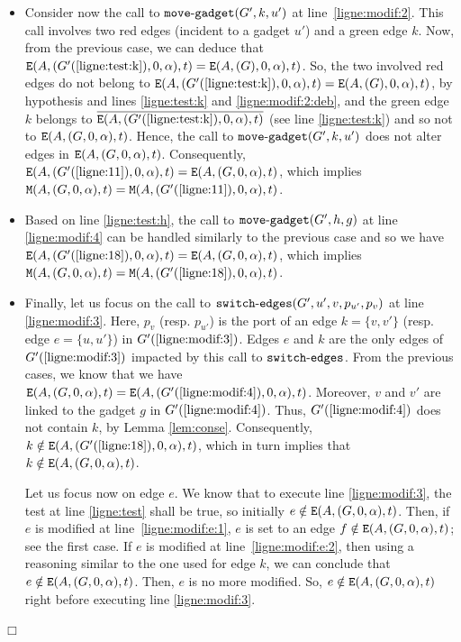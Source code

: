 \documentclass[11pt]{article}
\newcommand{\qed}{\hfill $\Box$ \bigbreak}
\newenvironment{proof}{\noindent {\bf Proof.}}{\qed}
\begin{document}
{\begin{proof}
\begin{itemize}
\item Consider now the call to ${\tt move\mbox{-}gadget}(G',k,u')$ at
  line~\ref{ligne:modif:2}. This call involves two red edges (incident
  to a gadget $u'$) and a green edge $k$.  Now, from the previous
  case, we can deduce that ${\tt E}(A,(G'(\ref{ligne:test:k}),0,\alpha),t) = {\tt E}(A,(G),0,\alpha),t)$. So, the two
  involved red edges do not belong to ${\tt E}(A,(G'(\ref{ligne:test:k}),0,\alpha),t) = {\tt E}(A,(G),0,\alpha),t)$, by
  hypothesis and lines \ref{ligne:test:k} and \ref{ligne:modif:2:deb}, and the green edge $k$ belongs to $\overline{{\tt
      E}(A,(G'(\ref{ligne:test:k}),0,\alpha),t)}$ (see line
  \ref{ligne:test:k}) and so not to ${\tt
    E}(A,(G,0,\alpha),t)$. Hence, the call to ${\tt
    move\mbox{-}gadget}(G',k,u')$ does not alter edges in ${\tt
    E}(A,(G,0,\alpha),t)$. Consequently, ${\tt
    E}(A,(G'(\ref{ligne:11}),0,\alpha),t) = {\tt
    E}(A,(G,0,\alpha),t)$, which implies ${\tt
    M}(A,(G,0,\alpha),t)={\tt M}(A,(G'(\ref{ligne:11}),0,\alpha),t)$.

\item Based on line \ref{ligne:test:h}, the call
  to ${\tt move\mbox{-}gadget}(G',h,g)$ at line \ref{ligne:modif:4}
  can be handled similarly to the previous case and so we have ${\tt
    E}(A,(G'(\ref{ligne:18}),0,\alpha),t) = {\tt
    E}(A,(G,0,\alpha),t)$, which implies ${\tt
    M}(A,(G,0,\alpha),t)={\tt M}(A,(G'(\ref{ligne:18}),0,\alpha),t)$.

\item Finally, let us focus on the call to ${\tt
  switch\mbox{-}edges}(G',u',v,p_{u'},p_v)$ at line
  \ref{ligne:modif:3}. Here, $p_v$ (resp. $p_{u'}$) is the port of an
  edge $k=\{v,v'\}$ (resp. edge $e=\{u,u'\}$) in $G'(\ref{ligne:modif:3})$. Edges $e$ and $k$ are the only edges of $G'(\ref{ligne:modif:3})$ impacted by this call to ${\tt
  switch\mbox{-}edges}$. From the previous
  cases, we know that we have ${\tt E}(A,(G,0,\alpha),t) = {\tt
    E}(A,(G'(\ref{ligne:modif:4}),0,\alpha),t)$. Moreover, $v$ and $v'$
  are linked to the gadget $g$ in $G'(\ref{ligne:modif:4})$. Thus,
  $G'(\ref{ligne:modif:4})$ does not contain $k$, by Lemma
  \ref{lem:conse}. Consequently, $k \notin {\tt
    E}(A,(G'(\ref{ligne:18}),0,\alpha),t)$, which in turn implies
  that $k \notin {\tt E}(A,(G,0,\alpha),t)$.
  
   Let us focus now on edge $e$. We know that to execute
   line \ref{ligne:modif:3}, the test at line \ref{ligne:test} shall
   be true, so initially $e \notin {\tt E}(A,(G,0,\alpha),t)$. Then,
   if $e$ is modified at line~\ref{ligne:modif:e:1}, $e$ is set to an
   edge $f \notin {\tt E}(A,(G,0,\alpha),t)$; see the first case. If
   $e$ is modified at line~\ref{ligne:modif:e:2}, then using a reasoning similar to the one used for edge $k$, we can conclude that $e \notin {\tt
     E}(A,(G,0,\alpha),t)$. Then, $e$ is no more modified. So, $e \notin {\tt
     E}(A,(G,0,\alpha),t)$ right before executing line \ref{ligne:modif:3}.


\end{itemize}
\end{proof}}
\end{document}
